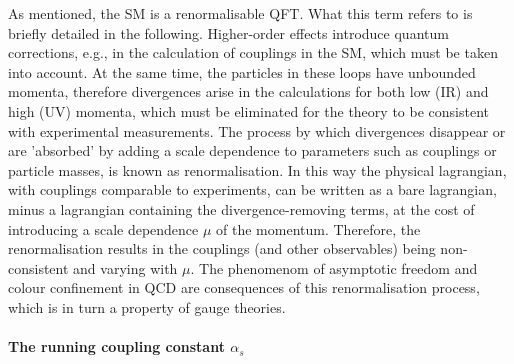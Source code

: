 As mentioned, the \ac{SM} is a renormalisable \ac{QFT}. What this term refers to is briefly detailed in the following. Higher-order effects introduce quantum corrections, e.g., in the calculation of couplings in the \ac{SM}, which must be taken into account. At the same time, the particles in these loops have unbounded momenta, therefore divergences arise in the calculations for both low (\ac{IR}) and high (\ac{UV}) momenta, which must be eliminated for the theory to be consistent with experimental measurements. The process by which divergences disappear or are 'absorbed' by adding a scale dependence to parameters such as couplings or particle masses, is known as renormalisation. In this way the physical lagrangian, with couplings comparable to experiments, can be written as a bare lagrangian, minus a lagrangian containing the divergence-removing terms, at the cost of introducing a scale dependence \(\mu\) of the momentum. Therefore, the renormalisation results in the couplings (and other observables) being non-consistent and varying with \(\mu\). The phenomenom of asymptotic freedom and colour confinement in \ac{QCD} are consequences of this renormalisation process, which is in turn a property of gauge theories.

\paragraph{The running coupling constant \(\alpha_s\)}

